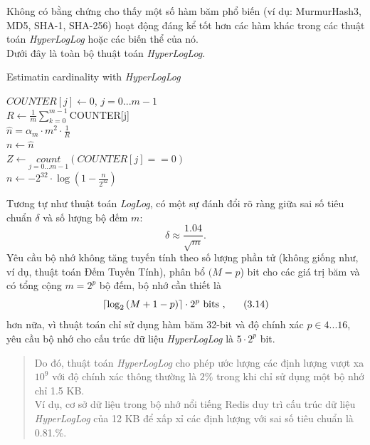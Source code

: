 \documentclass[letterpaper,13pt]{article}
\theoremstyle{mytheor}
\begin{document}
\indent Không có bằng chứng cho thấy một số hàm băm phổ biến (ví dụ: MurmurHash3, MD5, SHA-1, SHA-256) 
hoạt động đáng kể tốt hơn các hàm khác trong các thuật toán \textit{HyperLogLog} hoặc các biến thể của nó.\\
\indent Dưới đây là toàn bộ thuật toán \textit{HyperLogLog}.\\
\begin{algorithm}[H]
    \vspace{0.25cm}
    \DontPrintSemicolon
    \LinesNumberedHidden
    \caption[]{Estimatin cardinality with \textit{HyperLogLog}}
    $COUNTER[j] \gets $0, $j = 0...m - 1$\\
    $R \gets \frac{1}{m} \sum\limits_{k=0}^{m-1}$COUNTER[j] \\
    $\hat{n} = \alpha_m \cdot m^2 \cdot \frac{1}{R}$ \\
    $n \gets \hat{n}$ \\
    {
        $Z \gets \underset{j=0...m-1}{count}\left(COUNTER[j] == 0\right)$\\
    }
    {
        $n \gets -2^{32}\cdot\log\left(1-\frac{n}{2^{32}}\right)$
    }
    \vspace{0.25cm}
\end{algorithm}
\vspace{0.25cm}

Tương tự như thuật toán \textit{LogLog}, có một sự đánh đổi rõ ràng giữa sai số tiêu chuẩn $\delta$ và số lượng bộ đếm $m$:
\[\delta \approx \frac{1.04}{\sqrt{m}}.\]
\indent Yêu cầu bộ nhớ không tăng tuyến tính theo số lượng phần tử (không giống như, ví dụ, thuật toán Đếm Tuyến Tính), 
phân bổ $(M=p$) bit cho các giá trị băm và có tổng cộng $m = 2^p$ bộ đếm, bộ nhớ cần thiết là
\[\lceil\log_2\left(M + 1 - p\right)\rceil\cdot2^p \text{ bits , \indent (3.14)}\]
hơn nữa, vì thuật toán chỉ sử dụng hàm băm 32-bit và độ chính xác $p \in 4...16$, yêu cầu bộ nhớ cho 
cấu trúc dữ liệu \textit{HyperLogLog} là $5\cdot 2^p$ bit.\\
\vspace{0.4cm}
\begin{quote}
    Do đó, thuật toán \textit{HyperLogLog} cho phép ước lượng các định lượng vượt xa $10^9$ với độ chính xác thông thường là $2\%$ 
    trong khi chỉ sử dụng một bộ nhớ chỉ 1.5 KB.\\
    Ví dụ, cơ sở dữ liệu trong bộ nhớ nổi tiếng Redis duy trì cấu trúc dữ liệu \textit{HyperLogLog} của 12 KB để xấp xỉ các định lượng 
    với sai số tiêu chuẩn là 0.81.\%.
    \vspace{0.25cm}
\end{quote}
\end{document}

